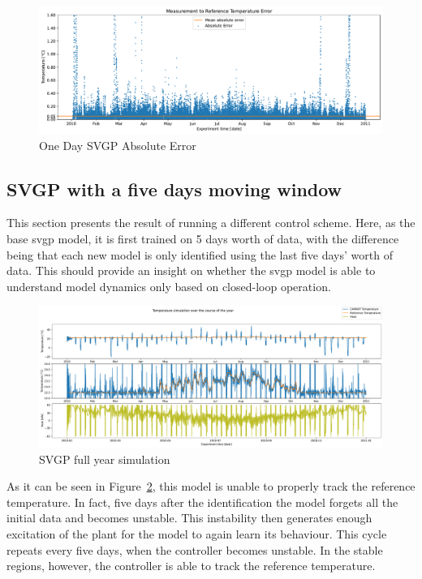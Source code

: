 \begin{figure}[ht]
    \centering
    \includegraphics[width =
    \textwidth]{Plots/6_SVGP_96pts_inf_window_12_averageYear_abserr.pdf}
    \caption{One Day SVGP Absolute Error}
    \label{fig:SVGP_96pts_abserr}
\end{figure}

\subsection{SVGP with a five days moving window}\label{sec:svgp_window}

This section presents the result of running a different control scheme. Here,
as the base \acrshort{svgp} model, it is first trained on 5 days worth of data,
with the difference being that each new model is only identified using the last
five days' worth of data. This should provide an insight on whether the
\acrshort{svgp} model is able to understand model dynamics only based on
closed-loop operation.

\begin{figure}[ht]
    \centering
    \includegraphics[width =
    \textwidth]{Plots/5_SVGP_480pts_480pts_window_12_averageYear_fullyear.pdf}
    \caption{SVGP full year simulation}
    \label{fig:SVGP_480window_fullyear_simulation}
\end{figure}

As it can be seen in Figure~\ref{fig:SVGP_480window_fullyear_simulation}, this
model is unable to properly track the reference temperature. In fact, five days
after the identification the model forgets all the initial data and becomes
unstable. This instability then generates enough excitation of the plant for the
model to again learn its behaviour. This cycle repeats every five days, when the
controller becomes unstable. In the stable regions, however, the controller is
able to track the reference temperature. 

